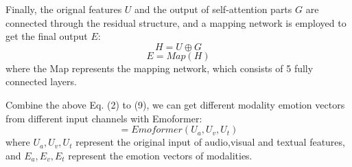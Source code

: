 Finally, the orignal features $U$ and the output of self-attention parts $G$ are connected through the residual structure, and a mapping network is employed to get the final output $E$:
\begin{equation}
	H=U \oplus G
\end{equation}
\begin{equation}
	E=Map (H)
\end{equation}
where the Map represents the mapping network, which consists of 5 fully connected layers.

Combine the above Eq. (2) to (9), we can get different modality emotion vectors from different input channels with Emoformer:
\begin{equation}
	[E_a,E_v,E_t]=Emoformer(U_a,U_v,U_t)
\end{equation}	
where $U_a, U_v, U_t$ represent the original input of audio,visual and textual features, and $E_a, E_v, E_t$ represent the emotion vectors of modalities. 

